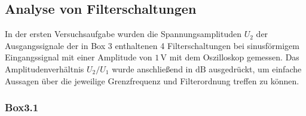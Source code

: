 \documentclass[a4paper, 12pt]{article}
\begin{document}
\subsection{Analyse von Filterschaltungen}

In der ersten Versuchsaufgabe wurden die Spannungsamplituden $U_2$ der Ausgangssignale der in
Box 3 enthaltenen 4 Filterschaltungen bei sinusförmigem Eingangssignal mit einer
Amplitude von $1 \, \si{\volt}$ mit dem Oszilloskop gemessen. Das
Amplitudenverhältnis $U_2/U_1$ wurde anschließend in $\si{\deci\bel}$
ausgedrückt, um einfache Aussagen über die jeweilige Grenzfrequenz und Filterordnung treffen zu können.

\subsubsection{Box3.1}
\end{document}
